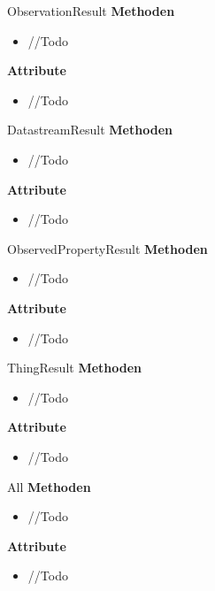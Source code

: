 \begin{Class}{ObservationResult}
    \textbf{Methoden}
    \begin{itemize}
        \item //Todo
    \end{itemize}
    
    \textbf{Attribute}
    \begin{itemize}
        \item //Todo
    \end{itemize}
\end{Class}

\begin{Class}{DatastreamResult}
    \textbf{Methoden}
    \begin{itemize}
        \item //Todo
    \end{itemize}
    
    \textbf{Attribute}
    \begin{itemize}
        \item //Todo
    \end{itemize}
\end{Class}

\begin{Class}{ObservedPropertyResult}
    \textbf{Methoden}
    \begin{itemize}
        \item //Todo
    \end{itemize}
    
    \textbf{Attribute}
    \begin{itemize}
        \item //Todo
    \end{itemize}
\end{Class}

\begin{Class}{ThingResult}
    \textbf{Methoden}
    \begin{itemize}
        \item //Todo
    \end{itemize}
    
    \textbf{Attribute}
    \begin{itemize}
        \item //Todo
    \end{itemize}
\end{Class}

\begin{Class}{All}
    \textbf{Methoden}
    \begin{itemize}
        \item //Todo
    \end{itemize}
    
    \textbf{Attribute}
    \begin{itemize}
        \item //Todo
    \end{itemize}
\end{Class}

